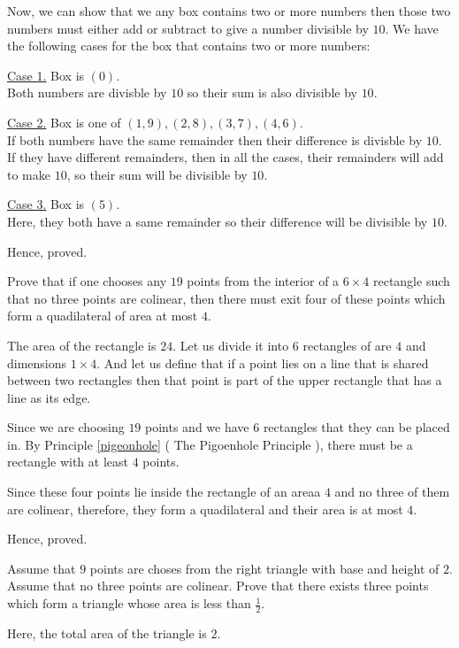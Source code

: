 	Now, we can show that we any box contains two or more numbers then those two numbers must either add or subtract to give a number divisible by $10$. We have the following cases for the box that contains two or more numbers:

	\underline{Case 1.} Box is $(0)$. \\
	Both numbers are divisble by $10$ so their sum is also divisible by $10$.

	\underline{Case 2.} Box is one of $(1,9),(2,8),(3,7),(4,6)$. \\
	If both numbers have the same remainder then their difference is divisble by $10$. \\
	If they have different remainders, then in all the cases, their remainders will add to make $10$, so their sum will be divisible by $10$.

	\underline{Case 3.} Box is $(5)$. \\
	Here, they both have a same remainder so their difference will be divisible by $10$.

	Hence, proved. 
\es

\bp 
	Prove that if one chooses any $19$ points from the interior of a $6 \times 4$ rectangle such that no three points are colinear, then there must exit four of these points which form a quadilateral of area at most $4$.
\ep 

\bs
	The area of the rectangle is $24$. Let us divide it into $6$ rectangles of are $4$ and dimensions $1 \times 4$.
	And let us define that if a point lies on a line that is shared between two rectangles 
	then that point is part of the upper rectangle that has a line as its edge.

	Since we are choosing $19$ points and we have $6$ rectangles that they can be placed in.
	By Principle \ref{pigeonhole} ( The Pigoenhole Principle ), there must be a rectangle with at least $4$ points.

	Since these four points lie inside the rectangle of an areaa $4$ and no three of them are colinear, therefore, they form a quadilateral and their area is at most $4$. 

	Hence, proved.
\es

\bp 
	Assume that $9$ points are choses from the right triangle with base and height of $2$. Assume that no three points are colinear. Prove that there exists three points which form a triangle whose area is less than $\frac{1}{2}$.
\ep 

\bs
	Here, the total area of the triangle is $2$.
	
